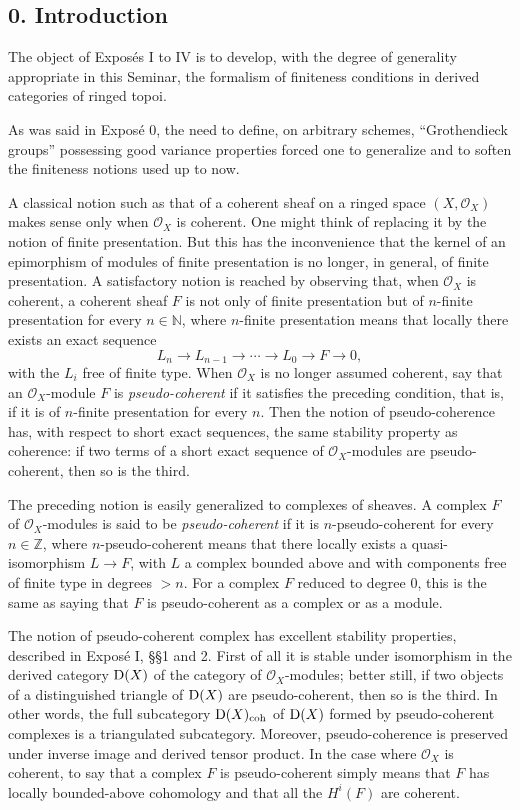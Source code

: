 \documentclass[11pt]{article}
\begin{document}
\subsection*{0. Introduction}
The object of Exposés I to IV is to develop, with the degree of generality appropriate in this Seminar, the formalism of finiteness conditions in derived categories of ringed topoi.

As was said in Exposé 0, the need to define, on arbitrary schemes, ``Grothendieck groups'' possessing good variance properties forced one to generalize and to soften the finiteness notions used up to now.

A classical notion such as that of a coherent sheaf on a ringed space \((X,\mathcal O_X)\) makes sense only when \(\mathcal O_X\) is coherent. One might think of replacing it by the notion of finite presentation. But this has the inconvenience that the kernel of an epimorphism of modules of finite presentation is no longer, in general, of finite presentation. A satisfactory notion is reached by observing that, when \(\mathcal O_X\) is coherent, a coherent sheaf \(F\) is not only of finite presentation but of \(n\)-finite presentation for every \(n\in\mathbb N\), where \(n\)-finite presentation means that locally there exists an exact sequence
\[
  L_n\longrightarrow L_{n-1}\longrightarrow \cdots \longrightarrow L_0\longrightarrow F\longrightarrow 0,
\]
with the \(L_i\) free of finite type. When \(\mathcal O_X\) is no longer assumed coherent, say that an \(\mathcal O_X\)-module \(F\) is \emph{pseudo-coherent} if it satisfies the preceding condition, that is, if it is of \(n\)-finite presentation for every \(n\). Then the notion of pseudo-coherence has, with respect to short exact sequences, the same stability property as coherence: if two terms of a short exact sequence of \(\mathcal O_X\)-modules are pseudo-coherent, then so is the third.

The preceding notion is easily generalized to complexes of sheaves. A complex \(F\) of \(\mathcal O_X\)-modules is said to be \emph{pseudo-coherent} if it is \(n\)-pseudo-coherent for every \(n\in\mathbb Z\), where \(n\)-pseudo-coherent means that there locally exists a quasi-isomorphism \(L\to F\), with \(L\) a complex bounded above and with components free of finite type in degrees \(>n\). For a complex \(F\) reduced to degree \(0\), this is the same as saying that \(F\) is pseudo-coherent as a complex or as a module.

The notion of pseudo-coherent complex has excellent stability properties, described in Exposé I, §§1 and 2. First of all it is stable under isomorphism in the derived category \(\mathrm D(X)\) of the category of \(\mathcal O_X\)-modules; better still, if two objects of a distinguished triangle of \(\mathrm D(X)\) are pseudo-coherent, then so is the third. In other words, the full subcategory \(\mathrm D(X)_{\mathrm{coh}}\) of \(\mathrm D(X)\) formed by pseudo-coherent complexes is a triangulated subcategory. Moreover, pseudo-coherence is preserved under inverse image and derived tensor product. In the case where \(\mathcal O_X\) is coherent, to say that a complex \(F\) is pseudo-coherent simply means that \(F\) has locally bounded-above cohomology and that all the \(H^i(F)\) are coherent.
\end{document}
